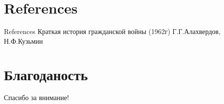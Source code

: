 \section{References}
\begin{frame}[t]{References}
	Краткая история гражданской войны (1962г) Г.Г.Алахвердов, Н.Ф.Кузьмин
	\url{}
	\url{}
\end{frame}



\section{Благоданость}
\begin{frame}
	\centering
	\huge
	Спасибо за внимание!
\end{frame}



